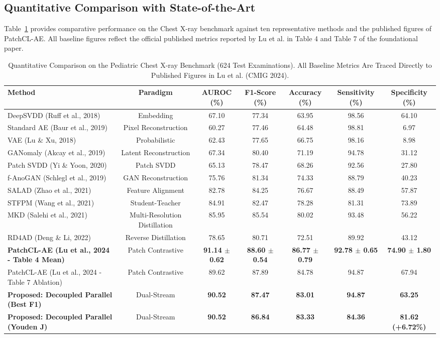 \documentclass[journal]{IEEEtran}
\begin{document}
\subsection{Quantitative Comparison with State-of-the-Art}
Table~\ref{tab:chest_xray} provides comparative performance on the Chest X-ray benchmark against ten representative methods and the published figures of PatchCL-AE. All baseline figures reflect the official published metrics reported by Lu et al. in Table 4 and Table 7 of the foundational paper.

\begin{table}[t]
\centering
\caption{Quantitative Comparison on the Pediatric Chest X-ray Benchmark (624 Test Examinations). All Baseline Metrics Are Traced Directly to Published Figures in Lu et al. (CMIG 2024).}
\label{tab:chest_xray}
\begin{tabular}{lcccccc}
\toprule
Method & Paradigm & AUROC (\%) & F1-Score (\%) & Accuracy (\%) & Sensitivity (\%) & Specificity (\%) \\
\midrule
DeepSVDD (Ruff et al., 2018) & Embedding & 67.10 & 77.34 & 63.95 & 98.56 & 64.10 \\
Standard AE (Baur et al., 2019) & Pixel Reconstruction & 60.27 & 77.46 & 64.48 & 98.81 & 6.97 \\
VAE (Lu \& Xu, 2018) & Probabilistic & 62.43 & 77.65 & 66.75 & 98.16 & 8.98 \\
GANomaly (Akcay et al., 2019) & Latent Reconstruction & 67.34 & 80.40 & 71.19 & 94.78 & 31.12 \\
Patch SVDD (Yi \& Yoon, 2020) & Patch SVDD & 65.13 & 78.47 & 68.26 & 92.56 & 27.80 \\
f-AnoGAN (Schlegl et al., 2019) & GAN Reconstruction & 75.76 & 81.34 & 74.33 & 88.79 & 40.23 \\
SALAD (Zhao et al., 2021) & Feature Alignment & 82.78 & 84.25 & 76.67 & 88.49 & 57.87 \\
STFPM (Wang et al., 2021) & Student-Teacher & 84.91 & 82.47 & 78.28 & 81.31 & 73.89 \\
MKD (Salehi et al., 2021) & Multi-Resolution Distillation & 85.95 & 85.54 & 80.02 & 93.48 & 56.22 \\
RD4AD (Deng \& Li, 2022) & Reverse Distillation & 78.65 & 80.71 & 72.51 & 89.92 & 43.12 \\
\midrule
\textbf{PatchCL-AE (Lu et al., 2024 - Table 4 Mean)} & Patch Contrastive & \textbf{91.14 $\pm$ 0.62} & \textbf{88.60 $\pm$ 0.54} & \textbf{86.77 $\pm$ 0.79} & \textbf{92.78 $\pm$ 0.65} & \textbf{74.90 $\pm$ 1.80} \\
PatchCL-AE (Lu et al., 2024 - Table 7 Ablation) & Patch Contrastive & 89.62 & 87.89 & 84.78 & 94.87 & 67.94 \\
\midrule
\textbf{Proposed: Decoupled Parallel (Best F1)} & Dual-Stream & \textbf{90.52} & \textbf{87.47} & \textbf{83.01} & \textbf{94.87} & \textbf{63.25} \\
\textbf{Proposed: Decoupled Parallel (Youden J)} & Dual-Stream & \textbf{90.52} & \textbf{86.84} & \textbf{83.33} & \textbf{84.36} & \textbf{81.62 (+6.72\%)} \\
\bottomrule
\end{tabular}
\end{table}
\end{document}
